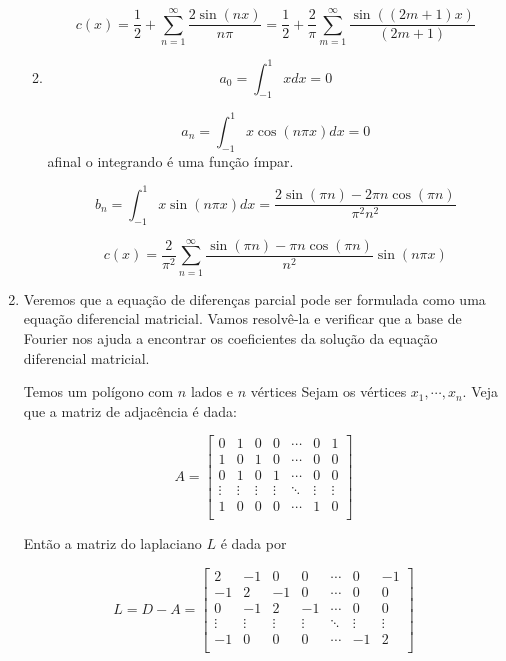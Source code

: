\documentclass{article}
\begin{document}
\begin{enumerate}
\begin{enumerate}
                        $$c(x) = \dfrac{1}{2} + \sum_{n=1}^\infty \dfrac{2\sin(nx)}{n\pi}
                        = \dfrac{1}{2} + \dfrac{2}{\pi}\sum_{m=1}^\infty \dfrac{\sin((2m+1)x)}{(2m+1)}$$

                    \item
                        $$a_0 = \int_{-1}^{1}x dx = 0$$
                        
                        $$a_n = \int_{-1}^{1} x\cos(n\pi x) dx = 0$$
                        afinal o integrando é uma função ímpar.

                        $$b_n = \int_{-1}^{1} x \sin(n\pi x) dx = \dfrac{2 \sin(\pi n) - 2 \pi n \cos(\pi n)}{\pi^2n^2}$$

                        $$c(x) = \dfrac{2}{\pi^2} \sum_{n=1}^{\infty} \dfrac{\sin(\pi n) - \pi n \cos(\pi n)}{n^2} \sin(n\pi x)$$
                \end{enumerate}

            \item Veremos que a equação de diferenças parcial pode ser formulada
                como uma equação diferencial matricial. Vamos resolvê-la e verificar 
                que a base de Fourier nos ajuda a encontrar os coeficientes da solução
                da equação diferencial matricial.

                Temos um polígono com $n$ lados e $n$ vértices
                Sejam os vértices $x_1, \cdots, x_n$.
                Veja que a matriz de adjacência é dada:

                $$A = \begin{bmatrix}
                    0 & 1 & 0 & 0 & \cdots & 0 & 1 \\
                    1 & 0 & 1 & 0 &\cdots & 0 & 0 \\
                    0 & 1 & 0 & 1 &\cdots & 0 & 0 \\
                    \vdots & \vdots & \vdots & \vdots & \ddots & \vdots & \vdots \\
                    1 & 0 & 0 & 0 & \cdots & 1 & 0 \\
                \end{bmatrix}$$

                Então a matriz do laplaciano $L$ é dada por

                $$L = D - A = \begin{bmatrix}
                    2 & -1 & 0 & 0 & \cdots & 0 & -1 \\
                    -1 & 2 & -1 & 0 &\cdots & 0 & 0 \\
                    0 & -1 & 2 & -1 &\cdots & 0 & 0 \\
                    \vdots & \vdots & \vdots & \vdots & \ddots & \vdots & \vdots \\
                    -1 & 0 & 0 & 0 & \cdots & -1 & 2 \\
                \end{bmatrix}$$


\end{enumerate}
\end{document}

